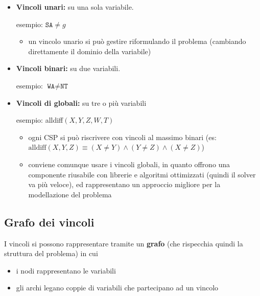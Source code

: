 \documentclass[a4paper,11pt]{report}
\begin{document}
\begin{itemize}
    \item \textbf{Vincoli unari:} su una sola variabile. 

        esempio: $\texttt{SA}\neq g$
    \begin{itemize}
        \item un vincolo unario si può gestire riformulando il problema (cambiando direttamente il dominio della variabile)
    \end{itemize}
    
    \vspace{0.2cm}
\item \textbf{Vincoli binari:} su due variabili. 
    
    esempio: $\texttt{WA} \neq \texttt{NT}$
    
    \vspace{0.2cm}
    \item \textbf{Vincoli di globali:} su tre o più variabili

    esempio: alldiff$(X,Y,Z,W,T)$
    \begin{itemize}
        \item ogni CSP si può riscrivere con vincoli al massimo binari (es: $\text{alldiff}(X,Y,Z) \equiv (X \neq Y) \land (Y \neq Z) \land (X \neq Z)$)
        \item conviene comunque usare i vincoli globali, in quanto offrono una componente riusabile con librerie e algoritmi ottimizzati (quindi il solver va più veloce), ed rappresentano un approccio migliore per la modellazione del problema
    \end{itemize}
\end{itemize}

\subsection{Grafo dei vincoli}
I vincoli si possono rappresentare tramite un \textbf{grafo} (che rispecchia quindi la struttura del problema) in cui
\begin{itemize}
    \item i nodi rappresentano le variabili
    \item gli archi legano coppie di variabili che partecipano ad un vincolo
\end{itemize}
\end{document}
